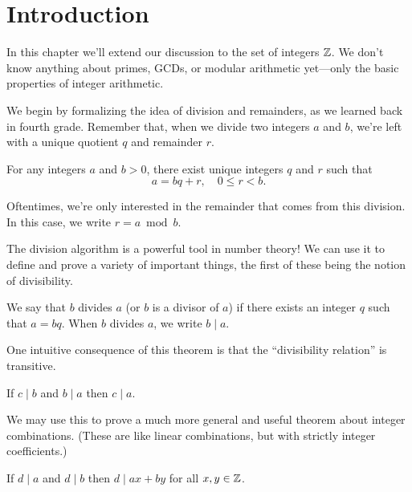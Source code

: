 \documentclass[../m55main.tex]{chapters}
\begin{document}
\section{Introduction}
In this chapter we'll extend our discussion to the set of integers $\mathbb{Z}$.
We don't know anything about primes, GCDs, or modular arithmetic yet---only the basic properties of integer arithmetic.

We begin by formalizing the idea of division and remainders, as we learned back in fourth grade.
Remember that, when we divide two integers $a$ and $b$, we're left with a unique quotient $q$ and remainder $r$.

\begin{theorem}
    For any integers $a$ and $b > 0$, there exist unique integers $q$ and $r$ such that
    \[ a = bq + r, \quad 0 \leq r < b. \]
\end{theorem}


Oftentimes, we're only interested in the remainder that comes from this division.
In this case, we write $r = a \bmod b$.

The division algorithm is a powerful tool in number theory!
We can use it to define and prove a variety of important things, the first of these being the notion of divisibility.

\begin{definition}[Divisibility]
    We say that $b$ divides $a$ (or $b$ is a divisor of $a$) if there exists an integer $q$ such that $a = bq$.
    When $b$ divides $a$, we write $b \mid a$.
\end{definition}

One intuitive consequence of this theorem is that the ``divisibility relation'' is transitive.

\begin{theorem}
    If $c \mid b$ and $b \mid a$ then $c \mid a$.
\end{theorem}


We may use this to prove a much more general and useful theorem about integer combinations.
(These are like linear combinations, but with strictly integer coefficients.)

\begin{theorem}
    If $d \mid a$ and $d \mid b$ then $d \mid ax + by$ for all $x,y \in \mathbb{Z}$.
\end{theorem}
\end{document}
